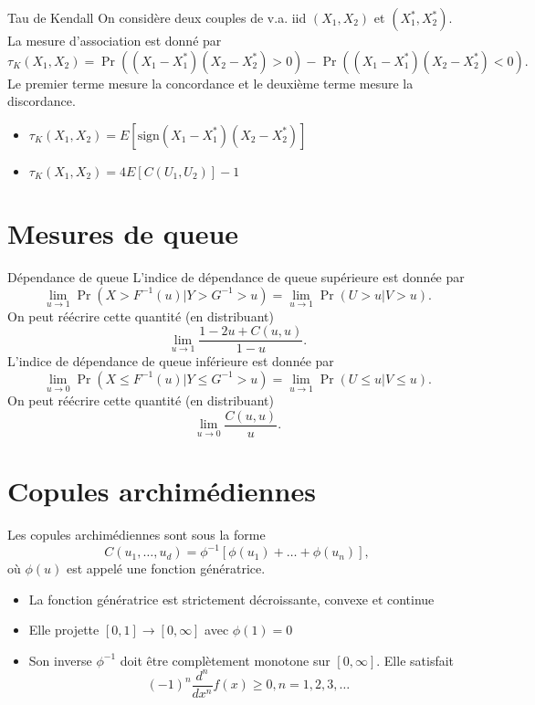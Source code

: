 \begin{definition}{Tau de Kendall}{}
	On considère deux couples de v.a. iid $(X_1, X_2)$ et $(X_1^*, X_2^*)$. La mesure d'association est donné par
	$$\tau_K\left(X_1, X_2\right) = \Pr\left((X_1 - X_1^*)(X_2 - X_2^*) > 0\right) - \Pr\left((X_1 - X_1^*)(X_2 - X_2^*) < 0\right).$$
	Le premier terme mesure la concordance et le deuxième terme mesure la discordance. 
	\tcblower
	\begin{itemize}
		\item $\displaystyle \tau_K\left(X_1, X_2\right) = E[\text{sign}(X_1 - X_1^*)(X_2 - X_2^*)]$
		\item $\displaystyle \tau_K\left(X_1, X_2\right) = 4E[C(U_1, U_2)] - 1$
	\end{itemize}
\end{definition}

\section{Mesures de queue}

\begin{definition}{Dépendance de queue}{}
	L'indice de dépendance de queue supérieure est donnée par
	$$\lim\limits_{u \to 1} \Pr\left(X > F^{-1}(u) \vert Y > G^{-1} > u\right) = \lim\limits_{u\to 1} \Pr\left(U>u \vert V>u\right).$$
	On peut réécrire cette quantité (en distribuant)
	$$\lim\limits_{u\to 1} \frac{1 - 2u + C(u, u)}{1-u}.$$
	\tcblower
	L'indice de dépendance de queue inférieure est donnée par
	$$\lim\limits_{u \to 0} \Pr\left(X \leq F^{-1}(u) \vert Y \leq G^{-1} > u\right) = \lim\limits_{u\to 1} \Pr\left(U\leq u \vert V\leq u\right).$$
	On peut réécrire cette quantité (en distribuant)
	$$\lim\limits_{u\to 0} \frac{C(u, u)}{u}.$$
\end{definition}

\section{Copules archimédiennes}

Les copules archimédiennes sont sous la forme 
$$C(u_1, \dots, u_d) = \phi ^{-1}\left[\phi(u_1) + \dots + \phi(u_n)\right],$$
où $\phi(u)$ est appelé une fonction génératrice. 

\begin{itemize}
	\item La fonction génératrice est strictement décroissante, convexe et continue
	\item Elle projette $[0, 1] \to [0, \infty]$ avec $\phi(1) = 0$
	\item Son inverse $\phi ^{-1}$ doit être complètement monotone sur $[0, \infty]$. Elle satisfait
	$$(-1)^n \frac{d^n}{dx^n}f(x) \geq 0, n = 1, 2, 3, \dots$$
\end{itemize}

